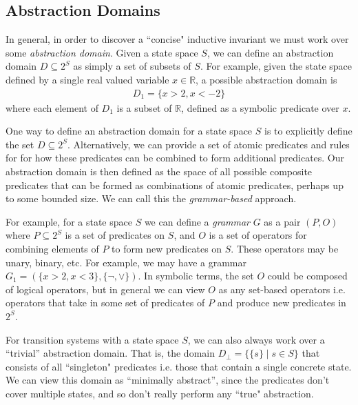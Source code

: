 \documentclass[10pt]{article}
\begin{document}
\subsection*{Abstraction Domains}

In general, in order to discover a ``concise" inductive invariant we must work over some \textit{abstraction domain}. Given a state space $S$, we can define an abstraction domain $D \subseteq 2^S$ as simply a set of subsets of $S$. For example, given the state space defined by a single real valued variable $x \in \mathbb{R}$, a possible abstraction domain is
\begin{align*}
    D_1 = \{x > 2, x < - 2\}
\end{align*} 
where each element of $D_1$ is a subset of $\mathbb{R}$, defined as a symbolic predicate over $x$.

One way to define an abstraction domain for a state space $S$ is to explicitly define the set $D \subseteq 2^S$. Alternatively, we can provide a set of atomic predicates and rules for for how these predicates can be combined to form additional predicates. Our abstraction domain is then defined as the space of all possible composite predicates that can be formed as combinations of atomic predicates, perhaps up to some bounded size. We can call this the \textit{grammar-based} approach.

For example, for a state space $S$ we can define a \textit{grammar} $G$ as a pair $(P,O)$ where $P \subseteq 2^S$ is a set of predicates on $S$, and $O$ is a set of operators for combining elements of $P$ to form new predicates on $S$. These operators may be unary, binary, etc. For example, we may have a grammar $G_1 = (\{x>2, x < 3\}, \{\neg, \vee\})$. In symbolic terms, the set $O$ could be composed of logical operators, but in general we can view $O$ as any set-based operators i.e. operators that take in some set of predicates of $P$ and produce new predicates in $2^S$.


For transition systems with a state space $S$, we can also always work over a ``trivial'' abstraction domain. That is, the domain $D_{\bot} = \{\{s\} \mid s \in S\}$ that consists of all ``singleton" predicates i.e. those that contain a single concrete state. We can view this domain as ``minimally abstract'', since the predicates don't cover multiple states, and so don't really perform any ``true" abstraction.
\end{document}
